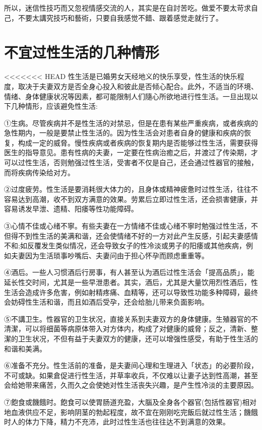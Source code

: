 \documentclass[12pt,UTF8]{ctexbook}
\begin{document}
所以，迷信性技巧而又忽视情感交流的人，其实是在自討苦吃。做爱不要太苛求自己，不要太講究技巧和藝術，只要自我感觉不錯、跟着感觉走就行了。

\section{不宜过性生活的几种情形}

<<<<<<< HEAD
性生活是已婚男女天经地义的快乐享受，性生活的快乐程度，取决于夫妻双方是否全身心投入和彼此是否倾心配合。此外，不适当的环境、情绪、身体健康状况等因素，都可能限制人们隨心所欲地进行性生活。一旦出现以下几种情形，应该避免性生活:

①生病。尽管疾病并不是性生活的对禁忌，但是在患有某些严重疾病，或者疾病的急性期内，一般是要禁止性生活的。因为性生活会对患者自身的健康和疾病的恢复，构成一定的威脅。慢性疾病或者疾病的恢复期内是否能够过性生活，需要获得医生的指导意见。患有性病的夫妻，一定要在性病治癒之后，并渡过了传染期，才可以过性生活，否则勉强过性生活，受害者不仅是自己，还会通过性器官的接触，而将疾病传染给对方。

②过度疲劳。性生活是要消耗很大体力的，且身体或精神疲惫时过性生活，往往不容易达到高潮，收不到双方满意的效果。劳累后立即过性生活，还会损害健康，并容易诱发早泄、遗精、阳痿等性功能障碍。

③心情不佳或心绪不寧。有些夫妻在一方情绪不佳或心绪不寧时勉强过性生活，不但得不到性生活的美满和谐，还会使情绪不好的一方对此产生反感，引起夫妻感情不和;如反覆发生类似情况，还会导致女子的性冷淡或男子的阳痿或其他疾病，例如夫妻因为生活琐事吵嘴后、夫妻问由于担心怀孕而顾虑重重等。

④酒后。一些人习惯酒后行房事，有人甚至认为酒后过性生活会「提高品质」，能延长性交时间，尤其是一些早泄患者。其实，酒后，尤其是大量饮用烈性酒后，性生活会造成许多危害，例如射精疼痛、血精等，还可以导致性功能多种障碍，最终会妨碍性生活和谐，而且如酒后受孕，还会给胎儿带来负面影响。

⑤不講卫生。性器官的卫生状况，直接关系到夫妻双方的身体健康。生殖器官的不清潔，可以将细菌等病原体带入对方体内，构成了对健康的威脅；反之，清新、整潔的卫生状况，不但有益于夫妻双方的健康，还可以增强性感受，有助于性生活的和谐和美满。

⑥准备不充分。性生活前的准备，是夫妻间心理和生理进入「状态」的必要阶段，不可或缺。如果倉促进行性生活，并草率收兵，不仅难以让妻子达到性高潮，甚至会给她带来痛苦，久而久之会使她对性生活丧失兴趣，是产生性冷淡的主要原因。

⑦飽食或饑餓时。飽食可以使胃肠道充盈，大腦及全身各个器官(包括性器官)相对地血液供应不足，影响阴茎的勃起程度，故不宜在刚刚吃完飯后就过性生活；饑餓时人的体力下降，精力不充沛，此时过性生活也往往达不到满意的效果。
\end{document}

